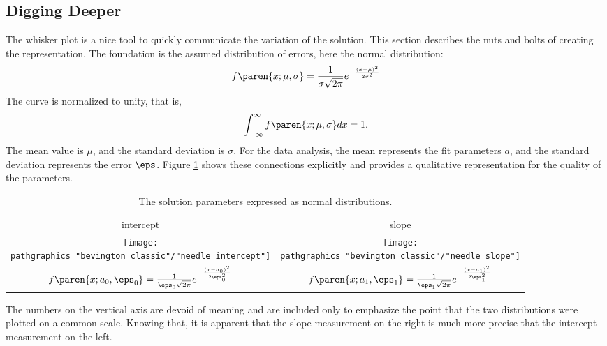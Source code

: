 \subsection{Digging Deeper}  %
The whisker plot is a nice tool to quickly communicate the variation of the solution. This section describes the nuts and bolts of creating the representation. The foundation is the assumed distribution of errors, here the normal distribution:
  \begin{equation*}   %
    f\paren{x;\mu,\sigma} = \frac{1}{\sigma \sqrt{2\pi}} e^{-\frac{(x-\mu)^{2}}{2\sigma^{2}}}
  \end{equation*}
The curve is normalized to unity, that is,
  \begin{equation*}   %
      \int_{-\infty}^{\infty} f\paren{x;\mu,\sigma} dx = 1.
  \end{equation*}
The mean value is $\mu$, and the standard deviation is $\sigma$. For the data analysis, the mean represents the fit parameters $a$, and the standard deviation represents the error $\eps$. Figure \ref{tab:dev normal} shows these connections explicitly and provides a qualitative representation for the quality of the parameters.
\begin{table}[htbp]  %
    \caption{The solution parameters expressed as normal distributions.}
    \begin{center}
        \begin{tabular}{cc}
            intercept & slope \\
            \texttt{[image: \\pathgraphics "bevington classic"/"needle intercept"]} &
            \texttt{[image: \\pathgraphics "bevington classic"/"needle slope"]} \\
            $f\paren{x;a_{0},\eps_{0}} = \frac{1}{\eps_{0} \sqrt{2\pi}} e^{-\frac{(x - a_{0})^{2}}{2\eps_{0}^{2}}}$ &
            $f\paren{x;a_{1},\eps_{1}} = \frac{1}{\eps_{1} \sqrt{2\pi}} e^{-\frac{(x - a_{1})^{2}}{2\eps_{1}^{2}}}$ \\
        \end{tabular}
    \end{center}
    \label{tab:dev normal}
\end{table}%

The numbers on the vertical axis are devoid of meaning and are included only to emphasize the point that the two distributions were plotted on a common scale. Knowing that, it is apparent that the slope measurement on the right is much more precise that the intercept measurement on the left.

